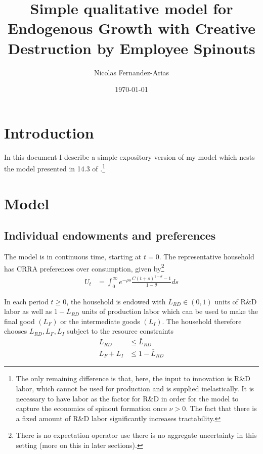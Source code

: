 \documentclass[11pt,english]{article}
\theoremstyle{remark}
\begin{document}
	
\title{Simple qualitative model for Endogenous Growth with Creative Destruction by Employee Spinouts}
\author{Nicolas Fernandez-Arias}
\date{\today}
\maketitle


\setcounter{tocdepth}{2}
\tableofcontents

\section{Introduction}

In this document I describe a simple expository version of my model which nests the model presented in 14.3 of \cite{acemoglu_introduction_2009}.\footnote{The only remaining difference is that, here, the input to innovation is R\&D labor, which cannot be used for production and is supplied inelastically. It is necessary to have labor as the factor for R\&D in order for the model to capture the economics of spinout formation once $\nu > 0$. The fact that there is a fixed amount of R\&D labor significantly increases tractability.} 

\section{Model}

\subsection{Individual endowments and preferences}

The model is in continuous time, starting at $t = 0$. The representative household has CRRA preferences over consumption, given by\footnote{There is no expectation operator use there is no aggregate uncertainty in this setting (more on this in later sections).}
\begin{align}
U_t &= \int_0^{\infty} e^{-\rho s} \frac{C(t+s)^{1-\theta} - 1}{1-\theta} ds \label{preferences}
\end{align}

In each period $t \ge 0$, the household is endowed with $\bar{L}_{RD} \in (0,1)$ units of R\&D labor as well as $1 - \bar{L}_{RD}$ units of production labor which can be used to make the final good $(L_F)$ or the intermediate goods $(L_I)$. The household therefore chooses $L_{RD},L_F,L_I$ subject to the resource constraints
\begin{align}
L_{RD} &\le \bar{L}_{RD} \label{labor_resource_constraint2} \\
L_F + L_I &\le 1 - \bar{L}_{RD} \label{labor_resource_constraint} 
\end{align}
\end{document}
